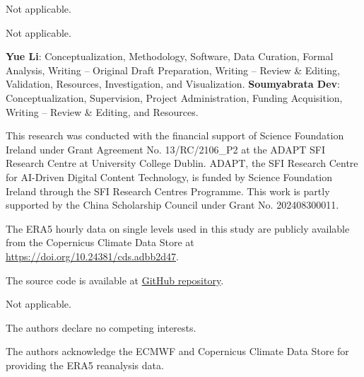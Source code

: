 \documentclass[referee,pdflatex,sn-basic]{sn-jnl}%
\theoremstyle{thmstyleone}%
\theoremstyle{thmstyletwo}%
\theoremstyle{thmstylethree}%
\begin{document}
Not applicable.

Not applicable.

\textbf{Yue Li}: Conceptualization, Methodology, Software, Data Curation, Formal Analysis, Writing -- Original Draft Preparation, Writing -- Review \& Editing, Validation, Resources, Investigation, and Visualization. \textbf{Soumyabrata Dev}: Conceptualization, Supervision, Project Administration, Funding Acquisition, Writing -- Review \& Editing, and Resources.

This research was conducted with the financial support of Science Foundation Ireland under Grant Agreement No. 13/RC/2106\_P2 at the ADAPT SFI Research Centre at University College Dublin. ADAPT, the SFI Research Centre for AI-Driven Digital Content Technology, is funded by Science Foundation Ireland through the SFI Research Centres Programme. This work is partly supported by the China Scholarship Council under Grant No. 202408300011.

The ERA5 hourly data on single levels used in this study are publicly
available from the Copernicus Climate Data Store at
\href{https://doi.org/10.24381/cds.adbb2d47}
{https://doi.org/10.24381/cds.adbb2d47}.

The source code is available at
\href{https://github.com/Liilychee/Interpretable-BU-LSTM-for-Rainfall-Prediction-in-Dublin}
{GitHub repository}.

Not applicable.

The authors declare no competing interests.

The authors acknowledge the ECMWF and Copernicus Climate Data Store for providing the ERA5 reanalysis data.
\end{document}
